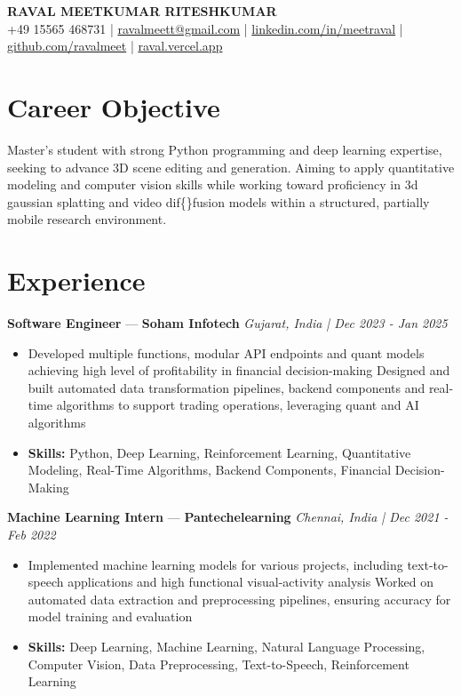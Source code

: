 \documentclass[a4paper,10pt]{article}
\begin{document}
\begin{center}
  {\Large\bfseries RAVAL MEETKUMAR RITESHKUMAR}\\[2pt]
  {\small +49 15565 468731 \;|\; \href{mailto:ravalmeett@gmail.com}{ravalmeett@gmail.com} \;|\; \href{https://www.linkedin.com/in/meetraval/}{linkedin.com/in/meetraval} \;|\; \href{https://github.com/ravalmeet}{github.com/ravalmeet} \;|\; \href{https://raval.vercel.app/}{raval.vercel.app}}
\end{center}
\vspace{-3pt}

\section*{Career Objective}
Master's student with strong Python programming and deep learning expertise, seeking to advance 3D scene editing and generation. Aiming to apply quantitative modeling and computer vision skills while working toward proficiency in 3d gaussian splatting and video dif\{\}fusion models within a structured, partially mobile research environment.\par

\section*{Experience}
\textbf{Software Engineer} — \textbf{Soham Infotech} \hfill \textit{Gujarat, India \;|\; Dec 2023 - Jan 2025}\par
\vspace{1pt}
\begin{itemize}
  \item Developed multiple functions, modular API endpoints and quant models achieving high level of profitability in financial decision-making Designed and built automated data transformation pipelines, backend components and real-time algorithms to support trading operations, leveraging quant and AI algorithms
  \item \textbf{Skills:} Python, Deep Learning, Reinforcement Learning, Quantitative Modeling, Real-Time Algorithms, Backend Components, Financial Decision-Making
\end{itemize}
\vspace{3pt}
\textbf{Machine Learning Intern} — \textbf{Pantechelearning} \hfill \textit{Chennai, India \;|\; Dec 2021 - Feb 2022}\par
\vspace{1pt}
\begin{itemize}
  \item Implemented machine learning models for various projects, including text-to-speech applications and high functional visual-activity analysis Worked on automated data extraction and preprocessing pipelines, ensuring accuracy for model training and evaluation
  \item \textbf{Skills:} Deep Learning, Machine Learning, Natural Language Processing, Computer Vision, Data Preprocessing, Text-to-Speech, Reinforcement Learning
\end{itemize}
\end{document}

